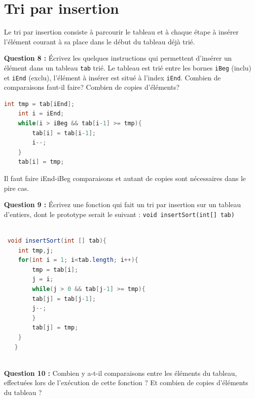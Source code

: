\documentclass[iutinfo,a4paper,nocorrections,10pt]{ustl-tdtp}
\begin{document}
\section{Tri par insertion}
Le tri par insertion consiste à parcourir le tableau et à chaque étape à insérer l'élément courant à sa place dans le début du tableau déjà trié.\newline


\textbf{Question 8 :} Écrivez les quelques instructions qui permettent d'insérer un élément dans un tableau \texttt{tab} trié. Le tableau est trié entre les bornes \texttt{iBeg} (inclu) et \texttt{iEnd} (exclu), l'élément à insérer est situé à l'index \texttt{iEnd}. Combien de comparaisons faut-il faire? Combien de copies d'éléments?\newline

\begin{correction}
{\color{red}
\begin{lstlisting}[language=java]
	int tmp = tab[iEnd];
	int i = iEnd;
	while(i > iBeg && tab[i-1] >= tmp){
	    tab[i] = tab[i-1];
	    i--;
	}
	tab[i] = tmp;

\end{lstlisting}

Il faut faire iEnd-iBeg comparaisons et autant de copies sont nécessaires dans le pire cas.

}
\end{correction}


\textbf{Question 9 :} Écrivez une fonction qui fait un tri par insertion sur un tableau d'entiers, dont le prototype serait le suivant : \texttt{void insertSort(int[] tab)}\newline
\begin{correction}


{\color{red}

\begin{lstlisting}[language=java]

 void insertSort(int [] tab){
	int tmp,j;
	for(int i = 1; i<tab.length; i++){
	    tmp = tab[i];
	    j = i;
	    while(j > 0 && tab[j-1] >= tmp){
		tab[j] = tab[j-1];
		j--;
	    }
	    tab[j] = tmp;
	}
   }
    
\end{lstlisting}

}
\end{correction}

 
\textbf{Question 10 :} Combien y a-t-il comparaisons entre les éléments du tableau, effectuées lors de l'exécution de cette fonction ? Et combien de copies d'éléments du tableau ?
\end{document}
